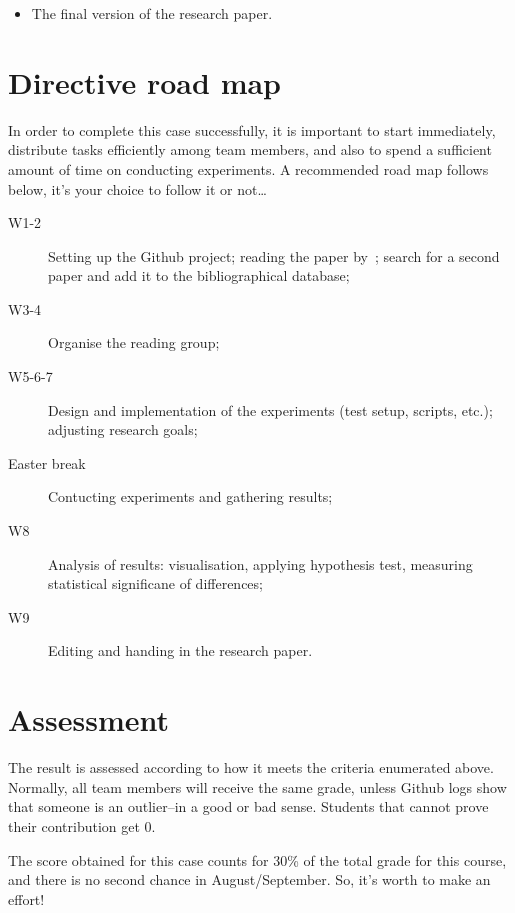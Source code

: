 \documentclass[fleqn,10pt]{artikeltin}
\begin{document}
\begin{itemize}
	\item The final version of the research paper.
\end{itemize}

\section{Directive road map}
\label{sec:roadmap}

In order to complete this case successfully, it is important to start immediately, distribute tasks efficiently among team members, and also to spend a sufficient amount of time on conducting experiments. A recommended road map follows below, it's your choice to follow it or not\ldots

\begin{description}
	\item[W1-2] Setting up the Github project; reading the paper by~\textcite{Bassil2012}; search for a second paper and add it to the bibliographical database;
	\item[W3-4] Organise the reading group;
	\item[W5-6-7] Design and implementation of the experiments (test setup, scripts, etc.); adjusting research goals;
	\item[Easter break] Contucting experiments and gathering results;
	\item[W8] Analysis of results: visualisation, applying hypothesis test, measuring statistical significane of differences;
	\item[W9] Editing and handing in the research paper.
\end{description}

\section{Assessment}

The result is assessed according to how it meets the criteria enumerated above. Normally, all team members will receive the same grade, unless Github logs show that someone is an outlier--in a good or bad sense. Students that cannot prove their contribution get 0.

The score obtained for this case counts for 30\% of the total grade for this course, and there is no second chance in August/September. So, it's worth to make an effort!


\printbibliography[heading=bibintoc]
\end{document}
